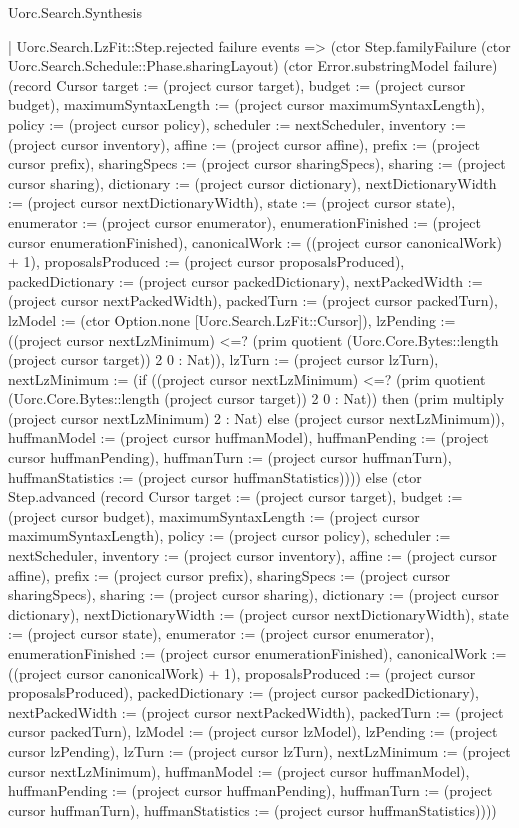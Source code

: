 \begin{lexlean}{Uorc.Search.Synthesis}
\begin{semanticmodule}
{      | Uorc.Search.LzFit::Step.rejected failure events => (ctor Step.familyFailure (ctor Uorc.Search.Schedule::Phase.sharingLayout) (ctor Error.substringModel failure) (record Cursor {target := (project cursor target), budget := (project cursor budget), maximumSyntaxLength := (project cursor maximumSyntaxLength), policy := (project cursor policy), scheduler := nextScheduler, inventory := (project cursor inventory), affine := (project cursor affine), prefix := (project cursor prefix), sharingSpecs := (project cursor sharingSpecs), sharing := (project cursor sharing), dictionary := (project cursor dictionary), nextDictionaryWidth := (project cursor nextDictionaryWidth), state := (project cursor state), enumerator := (project cursor enumerator), enumerationFinished := (project cursor enumerationFinished), canonicalWork := ((project cursor canonicalWork) + 1), proposalsProduced := (project cursor proposalsProduced), packedDictionary := (project cursor packedDictionary), nextPackedWidth := (project cursor nextPackedWidth), packedTurn := (project cursor packedTurn), lzModel := (ctor Option.none [Uorc.Search.LzFit::Cursor]), lzPending := ((project cursor nextLzMinimum) <=? (prim quotient (Uorc.Core.Bytes::length (project cursor target)) 2 0 : Nat)), lzTurn := (project cursor lzTurn), nextLzMinimum := (if ((project cursor nextLzMinimum) <=? (prim quotient (Uorc.Core.Bytes::length (project cursor target)) 2 0 : Nat)) then (prim multiply (project cursor nextLzMinimum) 2 : Nat) else (project cursor nextLzMinimum)), huffmanModel := (project cursor huffmanModel), huffmanPending := (project cursor huffmanPending), huffmanTurn := (project cursor huffmanTurn), huffmanStatistics := (project cursor huffmanStatistics)}))) else (ctor Step.advanced (record Cursor {target := (project cursor target), budget := (project cursor budget), maximumSyntaxLength := (project cursor maximumSyntaxLength), policy := (project cursor policy), scheduler := nextScheduler, inventory := (project cursor inventory), affine := (project cursor affine), prefix := (project cursor prefix), sharingSpecs := (project cursor sharingSpecs), sharing := (project cursor sharing), dictionary := (project cursor dictionary), nextDictionaryWidth := (project cursor nextDictionaryWidth), state := (project cursor state), enumerator := (project cursor enumerator), enumerationFinished := (project cursor enumerationFinished), canonicalWork := ((project cursor canonicalWork) + 1), proposalsProduced := (project cursor proposalsProduced), packedDictionary := (project cursor packedDictionary), nextPackedWidth := (project cursor nextPackedWidth), packedTurn := (project cursor packedTurn), lzModel := (project cursor lzModel), lzPending := (project cursor lzPending), lzTurn := (project cursor lzTurn), nextLzMinimum := (project cursor nextLzMinimum), huffmanModel := (project cursor huffmanModel), huffmanPending := (project cursor huffmanPending), huffmanTurn := (project cursor huffmanTurn), huffmanStatistics := (project cursor huffmanStatistics)})))
}
\end{semanticmodule}
\end{lexlean}
